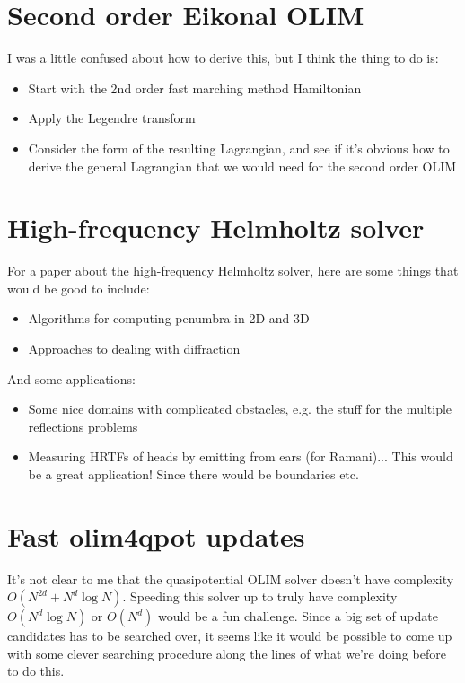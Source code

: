 \documentclass[eikonal.tex]{subfiles}
\begin{document}
\section{Second order Eikonal OLIM}

I was a little confused about how to derive this, but I think the
thing to do is:
\begin{itemize}
\item Start with the 2nd order fast marching method Hamiltonian
\item Apply the Legendre transform
\item Consider the form of the resulting Lagrangian, and see if it's
  obvious how to derive the general Lagrangian that we would need for
  the second order OLIM
\end{itemize}

\section{High-frequency Helmholtz solver}

For a paper about the high-frequency Helmholtz solver, here are some
things that would be good to include:
\begin{itemize}
\item Algorithms for computing penumbra in 2D and 3D
\item Approaches to dealing with diffraction
\end{itemize}
And some applications:
\begin{itemize}
\item Some nice domains with complicated obstacles, e.g. the stuff for
  the multiple reflections problems
\item Measuring HRTFs of heads by emitting from ears (for
  Ramani)... This would be a great application! Since there would be
  boundaries etc.
\end{itemize}

\section{Fast olim4qpot updates}

It's not clear to me that the quasipotential OLIM solver doesn't have
complexity $O(N^{2d} + N^d \log N)$. Speeding this solver up to truly
have complexity $O(N^d \log N)$ or $O(N^d)$ would be a fun
challenge. Since a big set of update candidates has to be searched
over, it seems like it would be possible to come up with some clever
searching procedure along the lines of what we're doing before to do
this.
\end{document}
